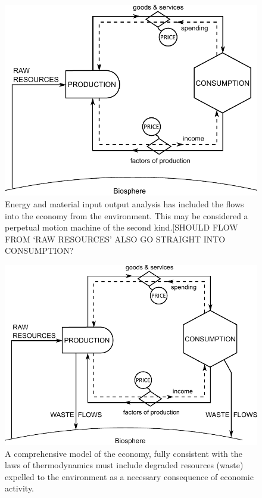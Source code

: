 \begin{figure}[h!]
\centering
\includegraphics[width=\linewidth]{Part_0/Chapter_Introduction/images/Perpetual_motion_2.pdf}
\caption{Energy and material input output analysis has included the flows into the economy from the environment. This may be considered a perpetual motion machine of the second kind.[SHOULD FLOW FROM `RAW RESOURCES' ALSO GO STRAIGHT INTO CONSUMPTION?}
\end{figure}

\begin{figure}[h!]
\centering
\includegraphics[width=\linewidth]{Part_0/Chapter_Introduction/images/PERKS.pdf}
\caption{A comprehensive model of the economy, fully consistent with the laws of thermodynamics must include degraded resources (waste) expelled to the environment as a necessary consequence of economic activity.}
\end{figure}


